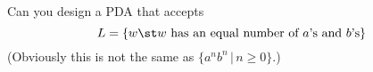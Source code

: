 Can you design a PDA that accepts
\[
L = \{ w \st w \text{ has an equal number of $a$'s and $b$'s} \}
\]
(Obviously this is not the same as
$\{a^n b^n \,|\, n \geq 0\}$.)
